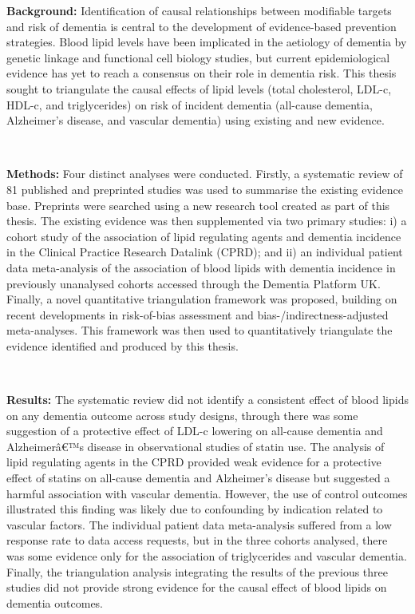 \documentclass[a4paper, twoside]{templates/ociamthesis}
\begin{document}
\begin{abstractseparate}
  \textbf{Background:} Identification of causal relationships between modifiable targets and risk of dementia is central to the development of evidence-based prevention strategies. Blood lipid levels have been implicated in the aetiology of dementia by genetic linkage and functional cell biology studies, but current epidemiological evidence has yet to reach a consensus on their role in dementia risk. This thesis sought to triangulate the causal effects of lipid levels (total cholesterol, LDL-c, HDL-c, and triglycerides) on risk of incident dementia (all-cause dementia, Alzheimer's disease, and vascular dementia) using existing and new evidence.

  ~

  \textbf{Methods:} Four distinct analyses were conducted. Firstly, a systematic review of 81 published and preprinted studies was used to summarise the existing evidence base. Preprints were searched using a new research tool created as part of this thesis. The existing evidence was then supplemented via two primary studies: i) a cohort study of the association of lipid regulating agents and dementia incidence in the Clinical Practice Research Datalink (CPRD); and ii) an individual patient data meta-analysis of the association of blood lipids with dementia incidence in previously unanalysed cohorts accessed through the Dementia Platform UK. Finally, a novel quantitative triangulation framework was proposed, building on recent developments in risk-of-bias assessment and bias-/indirectness-adjusted meta-analyses. This framework was then used to quantitatively triangulate the evidence identified and produced by this thesis.

  ~

  \textbf{Results:} The systematic review did not identify a consistent effect of blood lipids on any dementia outcome across study designs, through there was some suggestion of a protective effect of LDL-c lowering on all-cause dementia and Alzheimerâ€™s disease in observational studies of statin use. The analysis of lipid regulating agents in the CPRD provided weak evidence for a protective effect of statins on all-cause dementia and Alzheimer's disease but suggested a harmful association with vascular dementia. However, the use of control outcomes illustrated this finding was likely due to confounding by indication related to vascular factors. The individual patient data meta-analysis suffered from a low response rate to data access requests, but in the three cohorts analysed, there was some evidence only for the association of triglycerides and vascular dementia. Finally, the triangulation analysis integrating the results of the previous three studies did not provide strong evidence for the causal effect of blood lipids on dementia outcomes.


\end{abstractseparate}
\end{document}
